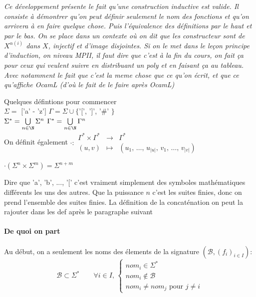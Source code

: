 
\textit{Ce développement présente le fait qu'une construction inductive est valide. Il consiste à démontrer qu'on peut définir seulement le nom des fonctions et qu'on arrivera à en faire quelque chose. Puis l'équivalence des définitions par le haut et par le bas. On se place dans un contexte où on dit que les constructeur sont de $X^{\alpha(i)}$ dans $X$, injectif et d'image disjointes. Si on le met dans le leçon principe d'induction, on niveau MPII, il faut dire que c'est à la fin du cours, on fait ça pour ceux qui veulent suivre en distribuant un poly et en faisant ça au tableau. Avec notamment le fait que c'est la meme chose que ce qu'on écrit, et que ce qu'affiche OcamL (d'où le fait de le faire après OcamL)}

\begin{definition}Quelques défintions pour commencer\\
	$\Sigma =  $ $[$'a' - 'z'$]$ \qquad $\Gamma = \Sigma \cup \{$'[', ']', '\#' $\}$\\
	$\Sigma^* = \bigcup\limits_{n \in \N} \Sigma^n$ \qquad $\Gamma^* = \bigcup\limits_{n \in \N} \Gamma^n$ \\
	On définit également $\cdot :\begin{array}{cll}
	\Gamma^* \times \Gamma^* & \to & \Gamma^*\\
	(u,v) & \mapsto & (u_1, \, \dots, \, u_{|u|}, \, v_1, \, \dots, \, v_{|v|})
	\end{array}$
\end{definition}

\begin{rem}
	$\cdot(\Sigma^n \times \Sigma^m) = \Sigma^{n+m}$
\end{rem}

\begin{com}
	Dire que 'a', 'b', ..., '[' c'est vraiment simplement des symboles mathématiques différents les uns des autres. Que la puissance $n$ c'est les suites finies, donc on prend l'ensemble des suites finies. La définition de la concaténation on peut la rajouter dans les def après le paragraphe suivant
\end{com}

\paragraph{De quoi on part} Au début, on a seulement les noms des élements de la signature $\left( \mathcal B, \left(f_i\right)_{i \in I} \right) $: 
$$\mathcal{B} \subset \Sigma^* \qquad \forall i \in I, \, \left\{ \begin{array}{l}
nom_i \in \Sigma^* \\ nom_i \notin \mathcal{B} \\ nom_i \neq nom_j \text { pour } j \neq i
\end{array} \right.$$

